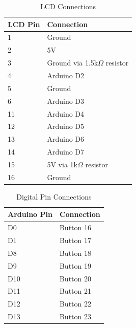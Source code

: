 \documentclass[journal]{IEEEtran}
\begin{document}
\begin{table}[H]
\centering
\caption{LCD Connections}
\label{tab:lcd_connections}
\begin{tabular}{ll}
\textbf{LCD Pin} & \textbf{Connection} \\
\hline
1 & Ground \\
2 & 5V \\
3 & Ground via 1.5k$\Omega$ resistor \\
4 & Arduino D2 \\
5 & Ground \\
6 & Arduino D3 \\
11 & Arduino D4 \\
12 & Arduino D5 \\
13 & Arduino D6 \\
14 & Arduino D7 \\
15 & 5V via 1k$\Omega$ resistor \\
16 & Ground \\
\end{tabular}
\end{table}

\begin{table}[H]
\centering
\caption{Digital Pin Connections}
\label{tab:digital_connections}
\begin{tabular}{ll}
\textbf{Arduino Pin} & \textbf{Connection} \\
\hline
D0 & Button 16 \\
D1 & Button 17 \\
D8 & Button 18 \\
D9 & Button 19 \\
D10 & Button 20 \\
D11 & Button 21 \\
D12 & Button 22 \\
D13 & Button 23 \\
\end{tabular}
\end{table}
\end{document}
